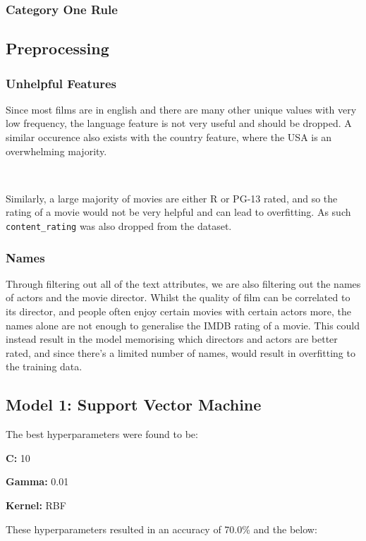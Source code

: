 \documentclass[11pt]{article}
\begin{document}
\subsubsection{Category One Rule}



\subsection{Preprocessing}

\subsubsection{Unhelpful Features}
Since most films are in english and there are many other unique values with very low frequency, the language feature is not very useful and should be dropped. A similar occurence also exists with the country feature, where the USA is an overwhelming majority. 

\ 

\noindent
Similarly, a large majority of movies are either R or PG-13 rated, and so the rating of a movie would not be very helpful and can lead to overfitting. As such \texttt{content\_rating} was also dropped from the dataset.

\subsubsection{Names}
Through filtering out all of the text attributes, we are also filtering out the names of actors and the movie director. Whilst the quality of film can be correlated to its director, and people often enjoy certain movies with certain actors more, the names alone are not enough to generalise the IMDB rating of a movie. This could instead result in the model memorising which directors and actors are better rated, and since there's a limited number of names, would result in overfitting to the training data.

\subsection{Model 1: Support Vector Machine}
The best hyperparameters were found to be:

\textbf{C: } 10

\textbf{Gamma: } 0.01

\textbf{Kernel: } RBF

\noindent
These hyperparameters resulted in an accuracy of 70.0\% and the below:
\end{document}
